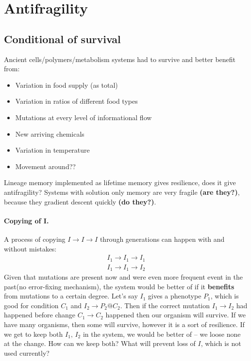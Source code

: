 \documentclass[12pt]{paper}
\begin{document}
\section{Antifragility}
\subsection{Conditional of survival}
Ancient cells/polymers/metabolism systems had to survive and better benefit from:
\begin{itemize}
 \item Variation in food supply (as total)
 \item Variation in ratios of different food types
 \item Mutations at every level of informational flow
 \item New arriving chemicals
 \item Variation in temperature
 \item Movement around??
\end{itemize}
Lineage memory implemented as lifetime memory gives resilience, does it give antifragility? 
Systems with solution only memory are very fragile \textbf{(are they?)}, because they gradient 
descent quickly \textbf{(do they?)}.

\paragraph{Copying of I.} A process of copying $I\to I \to I$ through generations can happen with 
and without mistakes:
\begin{eqnarray}
  I_1\to I_1 \to I_1\\
  I_1\to I_1 \to I_2
\end{eqnarray}
Given that mutations are present now and were even more frequent event in the past(no 
error-fixing mechanism), the system would be better of if it \textbf{benefits} from mutations to a 
certain degree. Let's say $I_1$ gives a phenotype $P_1$, which is good for condition $C_1$ and 
$I_2\to P_2@C_2$. Then if the correct mutation $I_1\to I_2$ had happened before change $C_1\to 
C_2$ happened then our organism will survive. If we have many organisms, then some will survive, 
however it is a sort of resilience. If we get to keep both $I_1,\,I_2$ in the system, we would be 
better of -- we loose none at the change. How can we keep both? What will prevent loss of $I$, 
which is not used currently?





\end{document}
